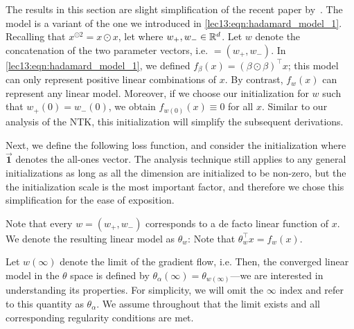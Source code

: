 The results in this section are slight simplification of the recent paper by~\citet{woodworth2020kernel}. The model is a variant of the one we introduced in \eqref{lec13:eqn:hadamard_model_1}. Recalling that $x^{\odot 2} = x \odot x$, let
where $w_+, w_- \in \mathbb R^d$. Let $w$ denote the concatenation of the two parameter vectors, i.e. $= (w_+, w_-)$.  In \eqref{lec13:eqn:hadamard_model_1}, we defined $f_\beta(x) = (\beta \odot \beta)^\top x$; this model can only represent positive linear combinations of $x$.  By contrast, $f_w(x)$ can represent any linear model. Moreover, if we choose our initialization for $w$ such that $w_+(0) = w_-(0)$, we obtain $f_{w(0)}(x) \equiv 0$ for all $x$. Similar to our analysis of the NTK, this initialization will simplify the subsequent derivations.

Next, we define the following loss function,
and consider the initialization
where $\vec{\mathbf{1}}$ denotes the all-ones vector. The analysis technique still applies to any general initializations as long as all the dimension are initialized to be non-zero, but the the initialization scale is the most important factor, and therefore we chose this simplification for the ease of exposition. 

Note that every $w = (w_+, w_{-})$ corresponds to a de facto linear function of $x$. We denote the resulting linear model as $\theta_w$:
Note that $\theta_w^\top x = f_w(x)$. 

Let $w(\infty)$ denote the limit of the gradient flow, i.e.
Then, the converged linear model in the $\theta$ space is defined by $\theta_\alpha(\infty) = \theta_{w(\infty)}$---we are interested in understanding its properties.  For simplicity, we will omit the $\infty$ index and refer to this quantity as $\theta_\alpha$. We assume throughout that the limit exists and all corresponding regularity conditions are met.

